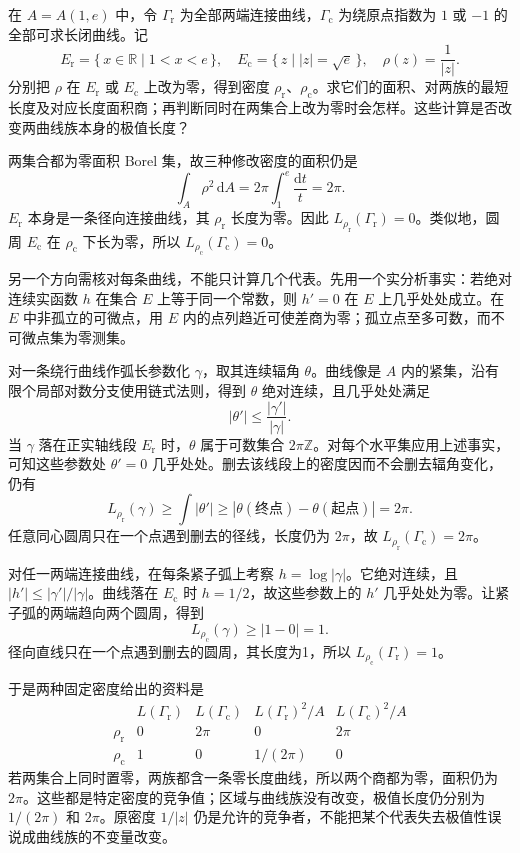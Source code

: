 \begin{exercise}\label{b3:ex:08-3}
在 \(A=A(1,e)\) 中，令 \(\Gamma_{\mathrm r}\) 为全部两端连接曲线，\(\Gamma_{\mathrm c}\) 为绕原点指数为 \(1\) 或 \(-1\) 的全部可求长闭曲线。记
\[
 E_{\mathrm r}=\{\,x\in\mathbb R\mid1<x<e\,\},\quad
 E_{\mathrm c}=\{\,z\mid|z|=\sqrt e\,\},\quad
 \rho(z)=\frac1{|z|}.
\]
分别把 \(\rho\) 在 \(E_{\mathrm r}\) 或 \(E_{\mathrm c}\) 上改为零，得到密度 \(\rho_{\mathrm r}\)、\(\rho_{\mathrm c}\)。求它们的面积、对两族的最短长度及对应长度面积商；再判断同时在两集合上改为零时会怎样。这些计算是否改变两曲线族本身的极值长度？
\end{exercise}
\begin{solution}
两集合都为零面积 Borel 集，故三种修改密度的面积仍是
\[
 \int_A\rho^2\,\mathrm{d}A
 =2\pi\int_1^e\frac{\mathrm{d}t}{t}=2\pi.
\]
\(E_{\mathrm r}\) 本身是一条径向连接曲线，其 \(\rho_{\mathrm r}\) 长度为零。因此
\(L_{\rho_{\mathrm r}}(\Gamma_{\mathrm r})=0\)。类似地，圆周 \(E_{\mathrm c}\) 在 \(\rho_{\mathrm c}\) 下长为零，所以
\(L_{\rho_{\mathrm c}}(\Gamma_{\mathrm c})=0\)。

另一个方向需核对每条曲线，不能只计算几个代表。先用一个实分析事实：若绝对连续实函数 \(h\) 在集合 \(E\) 上等于同一个常数，则 \(h'=0\) 在 \(E\) 上几乎处处成立。在 \(E\) 中非孤立的可微点，用 \(E\) 内的点列趋近可使差商为零；孤立点至多可数，而不可微点集为零测集。

对一条绕行曲线作弧长参数化 \(\gamma\)，取其连续辐角 \(\theta\)。曲线像是 \(A\) 内的紧集，沿有限个局部对数分支使用链式法则，得到 \(\theta\) 绝对连续，且几乎处处满足
\[
 |\theta'|\le\frac{|\gamma'|}{|\gamma|}.
\]
当 \(\gamma\) 落在正实轴线段 \(E_{\mathrm r}\) 时，\(\theta\) 属于可数集合 \(2\pi\mathbb Z\)。对每个水平集应用上述事实，可知这些参数处 \(\theta'=0\) 几乎处处。删去该线段上的密度因而不会删去辐角变化，仍有
\[
 L_{\rho_{\mathrm r}}(\gamma)
 \ge\int|\theta'|\ge|\theta(\text{终点})-\theta(\text{起点})|
 =2\pi.
\]
任意同心圆周只在一个点遇到删去的径线，长度仍为 \(2\pi\)，故
\(L_{\rho_{\mathrm r}}(\Gamma_{\mathrm c})=2\pi\)。

对任一两端连接曲线，在每条紧子弧上考察
\(h=\log|\gamma|\)。它绝对连续，且
\(|h'|\le|\gamma'|/|\gamma|\)。曲线落在 \(E_{\mathrm c}\) 时 \(h=1/2\)，故这些参数上的 \(h'\) 几乎处处为零。让紧子弧的两端趋向两个圆周，得到
\[
 L_{\rho_{\mathrm c}}(\gamma)\ge|1-0|=1.
\]
径向直线只在一个点遇到删去的圆周，其长度为1，所以
\(L_{\rho_{\mathrm c}}(\Gamma_{\mathrm r})=1\)。

于是两种固定密度给出的资料是
\[
\begin{array}{c|cc|cc}
 &L(\Gamma_{\mathrm r})&L(\Gamma_{\mathrm c})
 &L(\Gamma_{\mathrm r})^2/A&L(\Gamma_{\mathrm c})^2/A\\ \hline
 \rho_{\mathrm r}&0&2\pi&0&2\pi\\
 \rho_{\mathrm c}&1&0&1/(2\pi)&0
\end{array}
\]
若两集合上同时置零，两族都含一条零长度曲线，所以两个商都为零，面积仍为 \(2\pi\)。这些都是特定密度的竞争值；区域与曲线族没有改变，极值长度仍分别为 \(1/(2\pi)\) 和 \(2\pi\)。原密度 \(1/|z|\) 仍是允许的竞争者，不能把某个代表失去极值性误说成曲线族的不变量改变。
\end{solution}


